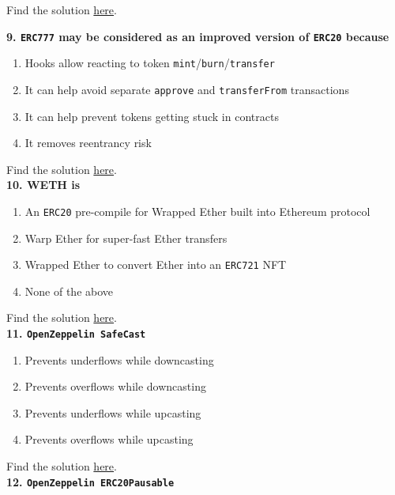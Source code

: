 Find the solution \hyperref[sec:exam3_q8]{here}.\\

\pagebreak

\textbf{9. \texttt{ERC777} may be considered as an improved version of \texttt{ERC20} because}

\begin{enumerate}[label=\Alph*.]
    \item Hooks allow reacting to token \verb|mint|/\verb|burn|/\verb|transfer|
    \item It can help avoid separate \verb|approve| and \verb|transferFrom| transactions
    \item It can help prevent tokens getting stuck in contracts
    \item It removes reentrancy risk
\end{enumerate}

Find the solution \hyperref[sec:exam3_q9]{here}.\\

\textbf{10. WETH is}

\begin{enumerate}[label=\Alph*.]
    \item An \verb|ERC20| pre-compile for Wrapped Ether built into Ethereum protocol
    \item Warp Ether for super-fast Ether transfers
    \item Wrapped Ether to convert Ether into an \verb|ERC721| NFT
    \item None of the above
\end{enumerate}

Find the solution \hyperref[sec:exam3_q10]{here}.\\

\textbf{11. \texttt{OpenZeppelin SafeCast}}

\begin{enumerate}[label=\Alph*.]
    \item Prevents underflows while downcasting
    \item Prevents overflows while downcasting
    \item Prevents underflows while upcasting
    \item Prevents overflows while upcasting
\end{enumerate}

Find the solution \hyperref[sec:exam3_q11]{here}.\\

\textbf{12. \texttt{OpenZeppelin ERC20Pausable}}


